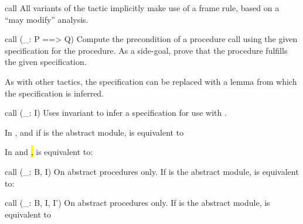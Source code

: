 \begin{tactic}{call}
  All variants of the  tactic implicitly make use of a frame
  rule, based on a ``may modify'' analysis.

  \begin{tsyntax}{call (_: P ==> Q)}
  Compute the precondition of a procedure call using the given
  specification for the procedure. As a side-goal, prove that the
  procedure fulfills the given specification.

  As with other tactics, the specification  can be
  replaced with a lemma from which the specification is inferred.
  \end{tsyntax}

  \begin{tsyntax}{call (_: I)}
  Uses invariant  to infer a specification for use with
  .

  In \prhl, and if  is the abstract module, 
  is equivalent to

  \begin{center}
  \end{center}

  In \phl and \hl,  is equivalent to:

  \begin{center}
  \end{center}
  \end{tsyntax}

  \begin{tsyntax}{call (_: B, I)}
  On \prhl abstract procedures only. If  is the abstract module,
   is equivalent to:

  \begin{center}
  \end{center}
  \end{tsyntax}

  \begin{tsyntax}{call (_: B, I, I')}
  On \prhl abstract procedures only. If  is the abstract module,
   is equivalent to


\end{tsyntax}
\end{tactic}
